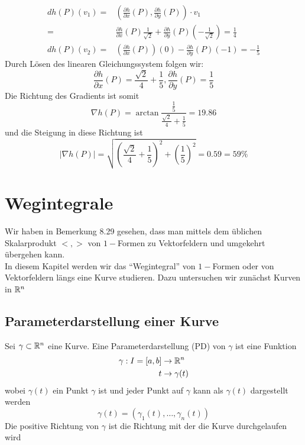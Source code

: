 \begin{enumerate}
\begin{align*}
dh \left( P\right) \left( v_1\right) = &\left( \frac{\partial h}{\partial x}\left(P\right), \frac{\partial h}{\partial y}\left(P\right)\right)\cdot v_1\\
= & \frac{\partial h}{\partial x}\left(P\right)\frac{1}{\sqrt{2}} +\frac{\partial h}{\partial y}\left( P\right) \left(-\frac{1}{\sqrt{2}}\right) = \frac{1}{4}\\
dh \left( P\right) \left( v_2\right) = &\left( \frac{\partial h}{\partial x}\left(P\right)\right) (0) - \frac{\partial h}{\partial y}\left(P\right)(-1)=-\frac{1}{5}
\end{align*}
Durch Lösen des linearen Gleichungssystem folgen wir:
\[\frac{\partial h}{\partial x}\left( P\right) = \frac{\sqrt{2}}{4}+\frac{1}{5}, \frac{\partial h}{\partial y}\left( P\right) = \frac{1}{5}\]
Die Richtung des Gradients ist somit \[ \nabla h\left( P \right) = \arctan{\frac{\frac{1}{5}}{\frac{\sqrt{2}}{4}+ \frac{1}{5}}}=19.86 \]
und die Steigung in diese Richtung ist
\[\left| \nabla h\left( P\right) \right| = \sqrt{\left( \frac{\sqrt{2}}{4}+\frac{1}{5}\right)^2 + \left( \frac{1}{5}\right)^2} = 0.59 = 59\%\] 
\end{enumerate}

\section{Wegintegrale}
Wir haben in Bemerkung 8.29 gesehen, dass man mittels dem üblichen Skalarprodukt $<,>$ von $1-$Formen zu Vektorfeldern und umgekehrt übergehen kann. \\

In diesem Kapitel werden wir das ``Wegintegral'' von $1-$Formen oder  von Vektorfeldern längs eine Kurve studieren. Dazu untersuchen wir zunächst Kurven in $\mathbb{R}^n$

\subsection*{Parameterdarstellung einer Kurve}
Sei $\gamma\subset\mathbb{R}^n$ eine Kurve. Eine Parameterdarstellung (PD) von $\gamma$ ist eine Funktion
\begin{align*}
\gamma : I=\lbrack a,b\rbrack &\to\mathbb{R}^n\\
t &\to \gamma (t)
\end{align*}
wobei $\gamma\left( t\right)$ ein Punkt $\gamma$ ist und jeder Punkt auf $\gamma$ kann als $\gamma\left( t\right)$ dargestellt werden
\[\gamma\left( t\right) = \left( \gamma_1 (t),\dots,\gamma_n (t)\right)\]
Die positive Richtung von $\gamma$ ist die Richtung mit der die Kurve durchgelaufen wird
